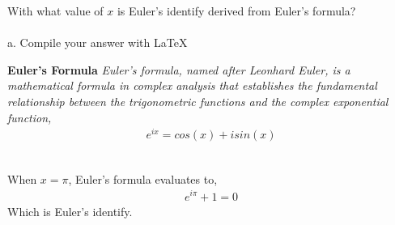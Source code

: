 With what value of $x$ is Euler's identify derived from Euler's formula?  \\\\
a. Compile your answer with \LaTeX \\

\begin{tcolorbox}
\textbf{
    Euler's Formula
} 
\textit{
    Euler's formula, named after Leonhard Euler, is a mathematical formula in complex analysis that establishes the fundamental relationship between the trigonometric functions and the complex exponential function,
}
\begin{align*}
    e^{ix} = cos(x) + i sin(x)
\end{align*}
\end{tcolorbox}

\begin{solution}\ \\
When $x=\pi$, Euler's formula evaluates to,
\begin{align*}
    e^{i\pi }+1=0
\end{align*}
Which is Euler's identify.
\end{solution}